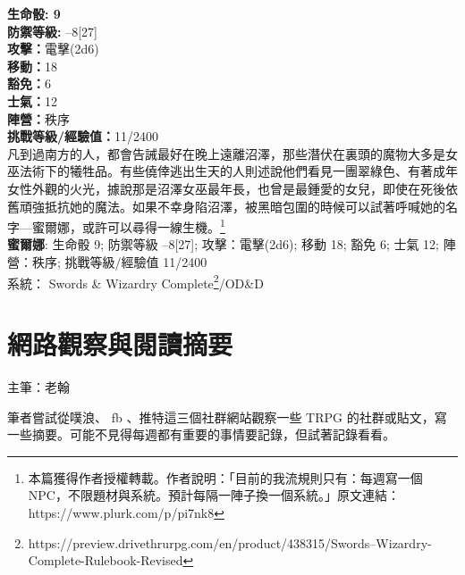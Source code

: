 \documentclass[10pt, a5paper]{article}
\begin{document}
\begin{CJK}{UTF8}{bsmi}
\textbf{生命骰: 9}\\
\textbf{防禦等級:} –8[27]\\
\textbf{攻擊：}電擊(2d6)\\
\textbf{移動：}18\\
\textbf{豁免：}6\\
\textbf{士氣：}12\\
\textbf{陣營：}秩序\\
\textbf{挑戰等級/經驗值：}11/2400\\

凡到過南方的人，都會告誡最好在晚上遠離沼澤，那些潛伏在裏頭的魔物大多是女巫法術下的犧牲品。有些僥倖逃出生天的人則述說他們看見一團翠綠色、有著成年女性外觀的火光，據說那是沼澤女巫最年長，也曾是最鍾愛的女兒，即使在死後依舊頑強抵抗她的魔法。如果不幸身陷沼澤，被黑暗包圍的時候可以試著呼喊她的名字—蜜爾娜，或許可以尋得一線生機。\footnote{本篇獲得作者授權轉載。作者說明：「目前的我流規則只有：每週寫一個NPC，不限題材與系統。預計每隔一陣子換一個系統。」原文連結： https://www.plurk.com/p/pi7nk8}\\

\noindent \textbf{蜜爾娜}: 生命骰 9; 防禦等級 –8[27]; 攻擊：電擊(2d6); 移動 18; 豁免 6; 士氣 12; 陣營：秩序; 挑戰等級/經驗值 11/2400\\

\noindent 系統： Swords \& Wizardry Complete\footnote{https://preview.drivethrurpg.com/en/product/438315/Swords--Wizardry-Complete-Rulebook-Revised}/OD\&D


\vfill
\pagebreak



\section{網路觀察與閱讀摘要}

主筆：老翰

筆者嘗試從噗浪、 fb 、推特這三個社群網站觀察一些 TRPG 的社群或貼文，寫一些摘要。可能不見得每週都有重要的事情要記錄，但試著記錄看看。


\end{CJK}
\end{document}
